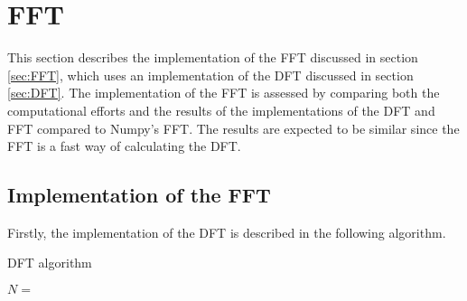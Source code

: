 \section{FFT}
This section describes the implementation of the FFT discussed in section \ref{sec:FFT}, which uses an implementation of the DFT discussed in section \ref{sec:DFT}. The implementation of the FFT is assessed by comparing both the computational efforts and the results of the implementations of the DFT and FFT compared to Numpy's FFT. The results are expected to be similar since the FFT is a fast way of calculating the DFT.

\subsection{Implementation of the FFT}
Firstly, the implementation of the DFT is described in the following algorithm.
\begin{algorithm}
\caption{DFT algorithm}
\label{DFTalg}
\begin{algorithmic}[1]
\State $N = $ 
		 
		\EndFor
	\EndFor
\EndProcedure
\end{algorithmic}
\end{algorithm}

